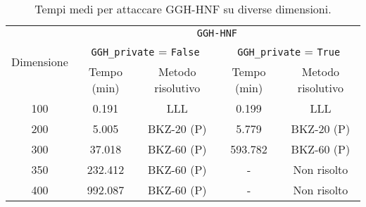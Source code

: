 \begin{table}[H]
    \centering
    \begin{tabular}{|c|c|c|c|c|}
    \hline
    \multirow{3}{*}{Dimensione} & 
    \multicolumn{4}{c|}{\texttt{GGH-HNF}} \\ %
    \cline{2-5}
     & \multicolumn{2}{c|}{\texttt{GGH\_private} = \texttt{False}} &
     \multicolumn{2}{c|}{\texttt{GGH\_private} = \texttt{True}} \\
    \cline{2-5}
     & Tempo (min) & Metodo risolutivo & Tempo (min) & Metodo risolutivo \\
    \hline
    100 & 0.191 & LLL & 0.199 & LLL \\
    \hline
    200 & 5.005 & BKZ-20 (P) & 5.779 & BKZ-20 (P)\\
    \hline
    300 & 37.018 & BKZ-60 (P) & 593.782 & BKZ-60 (P)\\
    \hline
    350 & 232.412 & BKZ-60 (P) & - & Non risolto\\
    \hline
    400 & 992.087 & BKZ-60 (P) & - & Non risolto \\
    \hline
    \end{tabular}
    \caption{Tempi medi per attaccare GGH-HNF su diverse dimensioni.}
    \label{tab:risultati-gghhnf-attacchi}
\end{table}

